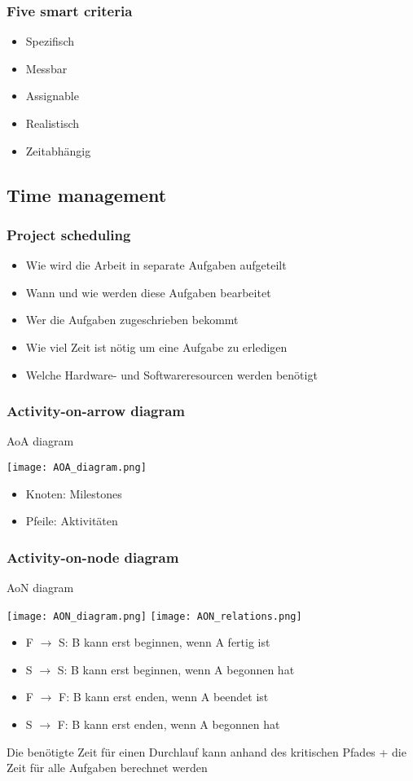 \subsubsection{Five smart criteria}
\begin{itemize}
	\item Spezifisch
	\item Messbar 
	\item Assignable 
	\item Realistisch
	\item Zeitabhängig
\end{itemize}
\subsection{Time management}
\subsubsection{Project scheduling}
\begin{itemize}
	\item Wie wird die Arbeit in separate Aufgaben aufgeteilt
	\item Wann und wie werden diese Aufgaben bearbeitet
	\item Wer die Aufgaben zugeschrieben bekommt
	\item Wie viel Zeit ist nötig um eine Aufgabe zu erledigen
	\item Welche Hardware- und Softwareresourcen werden benötigt
\end{itemize}
\subsubsection{Activity-on-arrow diagram}
\begin{table}[H]
\caption{AoA diagram}
\texttt{[image: AOA\_diagram.png]}
\end{table}
\begin{itemize}
	\item Knoten: Milestones
	\item Pfeile: Aktivitäten
\end{itemize}
\subsubsection{Activity-on-node diagram}
\begin{table}[H]
\caption{AoN diagram}
\begin{center}
	\texttt{[image: AON\_diagram.png]}
	\texttt{[image: AON\_relations.png]}
\end{center}
\end{table}
\begin{itemize}
	\item F $\to$ S: B kann erst beginnen, wenn A fertig ist
	\item S $\to$ S: B kann erst beginnen, wenn A begonnen hat
	\item F $\to$ F: B kann erst enden, wenn A beendet ist
	\item S $\to$ F: B kann erst enden, wenn A begonnen hat
\end{itemize}
Die benötigte Zeit für einen Durchlauf kann anhand des kritischen Pfades + die Zeit für alle Aufgaben berechnet werden 
